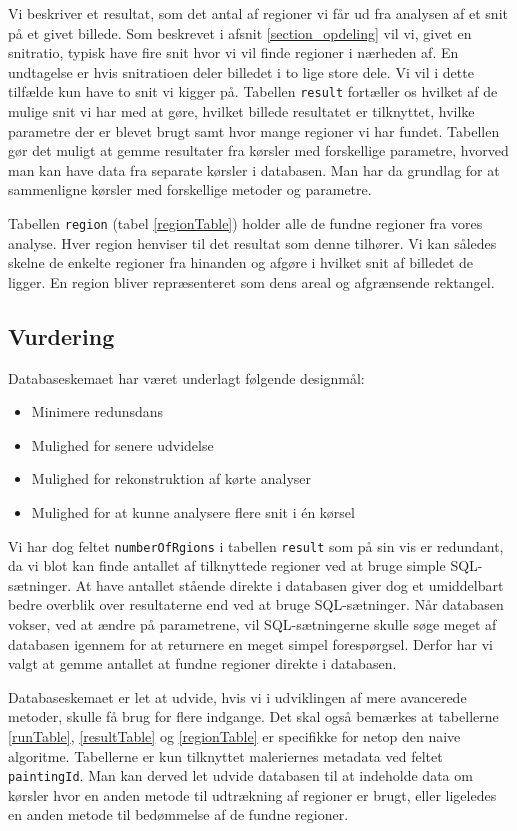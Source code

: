 {Vi beskriver et resultat, som det antal af regioner vi får ud fra
analysen af et snit på et givet billede. Som beskrevet i afsnit
\ref{section_opdeling} vil vi, givet en snitratio, typisk have fire snit
hvor vi vil finde regioner i nærheden af. En undtagelse er hvis
snitratioen deler billedet i to lige store dele. Vi vil i dette tilfælde
kun have to snit vi kigger på. Tabellen \texttt{result} fortæller os
hvilket af de mulige snit vi har med at gøre, hvilket billede resultatet
er tilknyttet, hvilke parametre der er blevet brugt samt hvor mange
regioner vi har fundet. Tabellen gør det muligt at gemme resultater fra
kørsler med forskellige parametre, hvorved man kan have data fra
separate kørsler i databasen. Man har da grundlag for at sammenligne
kørsler med forskellige metoder og parametre.

Tabellen \texttt{region} (tabel \ref{regionTable}) holder alle de fundne
regioner fra vores analyse. Hver region henviser til det resultat som
denne tilhører. Vi kan således skelne de enkelte regioner fra hinanden
og afgøre i hvilket snit af billedet de ligger. En region bliver
repræsenteret som dens areal og afgrænsende rektangel.

\subsection{Vurdering}
Databaseskemaet har været underlagt følgende designmål:

\begin{itemize}
    \item Minimere redunsdans
    \item Mulighed for senere udvidelse
    \item Mulighed for rekonstruktion af kørte analyser
    \item Mulighed for at kunne analysere flere snit i én kørsel
\end{itemize}

Vi har dog feltet \texttt{numberOfRgions} i tabellen \texttt{result} som
på sin vis er redundant, da vi blot kan finde antallet af tilknyttede
regioner ved at bruge simple SQL-sætninger. At have antallet stående
direkte i databasen giver dog et umiddelbart bedre overblik over
resultaterne end ved at bruge SQL-sætninger. Når databasen vokser, ved
at ændre på parametrene, vil SQL-sætningerne skulle søge meget af
databasen igennem for at returnere en meget simpel forespørgsel. Derfor
har vi valgt at gemme antallet at fundne regioner direkte i databasen.

Databaseskemaet er let at udvide, hvis vi i udviklingen af mere
avancerede metoder, skulle få brug for flere indgange. Det skal også
bemærkes at tabellerne \ref{runTable}, \ref{resultTable} og
\ref{regionTable} er specifikke for netop den naive algoritme.
Tabellerne er kun tilknyttet maleriernes metadata ved feltet
\texttt{paintingId}. Man kan derved let udvide databasen til at
indeholde data om kørsler hvor en anden metode til udtrækning af
regioner er brugt, eller ligeledes en anden metode til bedømmelse af de
fundne regioner.

}

